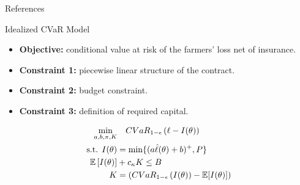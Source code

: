 \documentclass{beamer}
\begin{document}

\begin{frame}{References}
\printbibliography
\end{frame}

\begin{frame}{Idealized CVaR Model}
\begin{itemize}
    \item \textbf{Objective:} conditional value at risk of the farmers' loss net of insurance.
    \item  \textbf{Constraint 1:} piecewise linear structure of the contract. 
    \item \textbf{Constraint 2:} budget constraint.
    \item \textbf{Constraint 3:} definition of required capital.
\end{itemize}
 
\begin{align}
        \min_{a,b,\pi, K}  & \quad CVaR_{1-\epsilon}\left ( \ell - I(\theta) \right ) \notag\\
        \text{s.t.   }I(\theta) &= \min \{ (a\hat{\ell}(\theta) + b)^+,P \} \\
        \mathbb{E}\left [ I(\theta) \right ] &+ c_{\kappa} K \leq B \\
        K &= \left( CVaR_{1-\epsilon}\left ( I(\theta) \right ) - \mathbb{E}[I(\theta)] \right) \label{cons-budget}
    \end{align}
\end{frame}
\end{document}

